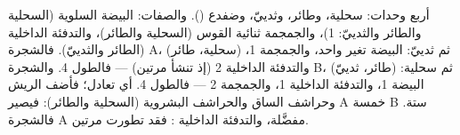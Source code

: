 \begin{example}\label{ex:b1:classifying-biodiversity:count}
أربع وحدات: سحلية، وطائر، وثدييّ، وضفدع (). والصفات:
البيضة السلوية (السحلية والطائر والثدييّ: 1)، والجمجمة ثنائية القوس (السحلية
والطائر)، والتدفئة الداخلية (الطائر والثدييّ). فالشجرة A، (سحلية، طائر) ثم ثدييّ:
البيضة تغير واحد، والجمجمة 1، والتدفئة الداخلية 2 (إذ تنشأ مرتين) --- فالطول 4.
والشجرة B، (طائر، ثدييّ) ثم سحلية: البيضة 1، والتدفئة الداخلية 1، والجمجمة 2 ---
فالطول 4. أي تعادل؛ فأضف الريش وحراشف الساق
والحراشف البشروية (السحلية والطائر): فيصير  A خمسة  B ستة. فالشجرة A
مفضَّلة، والتدفئة الداخلية : فقد تطورت مرتين.
\end{example}

